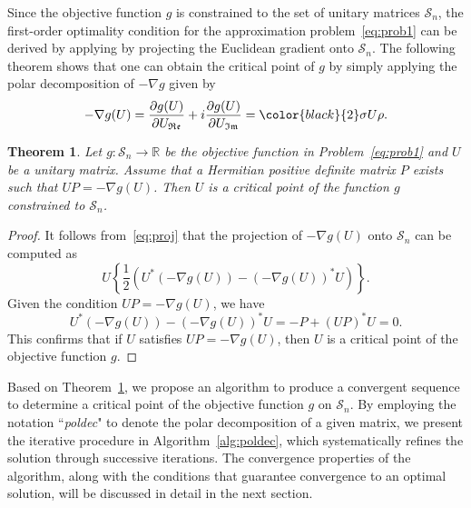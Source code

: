 \documentclass[sn-mathphys-num]{sn-jnl}%
\theoremstyle{thmstyleone}%
\newtheorem{theorem}{Theorem}%
\theoremstyle{thmstyletwo}%
\theoremstyle{thmstylethree}%
\begin{document}
{\color{black}
Since the objective function $g$ is constrained to the set of unitary matrices $\mathcal{S}_n$, the first-order optimality condition for the approximation problem~\ref{eq:prob1} can be derived by applying by projecting the Euclidean gradient onto $\mathcal{S}_n$. The following theorem shows that one can obtain the critical point of $g$ by simply applying the polar decomposition of $-\nabla g$ given by
\begin{equation*}
     -\nabla  g (U) = 
\dfrac{\partial g(U)}{\partial U_{\mathfrak{Re}}}+i\dfrac{\partial g(U)}{\partial U_{\mathfrak{Im}}} =  {\color{black}{2}} \sigma U \rho.  
\end{equation*}
\begin{theorem}\label{lemma:polarcri}
 {Let $g: \mathcal{S}_n \rightarrow \mathbb{R}$ be the objective function in Problem~\ref{eq:prob1} and $U$ be a unitary matrix.  Assume that a Hermitian positive definite matrix $P$ exists such that $UP = -\nabla g(U)$. Then} $U$ is a critical point of the function $g$ constrained to $\mathcal{S}_n$.
\end{theorem}
%
\begin{proof}
It follows from~\eqref{eq:proj} that the projection of $-\nabla g(U)$ onto $\mathcal{S}_n$ can be computed as
\begin{equation*}
U\left\{ \frac{1}{2} \left(U^* \left(-\nabla g(U)\right) - \left(-\nabla g(U)\right)^* U \right)\right\}.
\end{equation*}
Given the condition $UP = -\nabla g(U)$, we have
    \begin{equation*}
        U^*\left(-\nabla g(U)\right)- \left(-\nabla g(U)\right)^* U = -P+(UP)^* U = 0.
    \end{equation*}
This confirms that if $U$ satisfies $UP = -\nabla g(U)$, then $U$ is a critical point of the objective function $g$.
\end{proof}

%
%

Based on Theorem~\ref{lemma:polarcri}, we propose an algorithm to produce a convergent sequence to determine a critical point of the objective function $g$ on $\mathcal{S}_n$. 
By employing the notation ``\emph{poldec}" to denote the polar decomposition of a given matrix, we present the iterative procedure in Algorithm~\ref{alg:poldec}, which systematically refines the solution through successive iterations. The convergence properties of the algorithm, along with the conditions that guarantee convergence to an optimal solution, will be discussed in detail in the next section.
}
\end{document}
